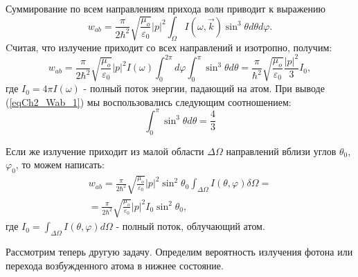 Суммирование по всем направлениям прихода волн приводит к выражению
\begin{equation}
w_{ab} = \frac{\pi}{2 \hbar^2}\sqrt{\frac{\mu_o}{\varepsilon_0}}
\left|p\right|^2
\int_{\Omega}I\left(\omega, \vec{k}\right)
\sin^3 \theta d \theta d \varphi.
\end{equation}
Cчитая, что излучение приходит со всех направлений и изотропно, 
получим: 
\begin{equation}
w_{ab} = \frac{\pi}{2 \hbar^2}\sqrt{\frac{\mu_o}{\varepsilon_0}}
\left|p\right|^2 I\left(\omega\right)
\int_{0}^{2 \pi}d \varphi \int_0^{\pi}
\sin^3 \theta d \theta = 
\frac{\pi}{ \hbar^2}\sqrt{\frac{\mu_o}{\varepsilon_0}}
\frac{\left|p\right|^2}{3}I_0,
\label{eqCh2_Wab_1}
\end{equation}
где $I_0 = 4 \pi I\left(\omega\right)$ - полный поток энергии,
падающий на атом. При выводе  (\ref{eqCh2_Wab_1})
мы воспользовались следующим соотношением:
\[
 \int_0^{\pi}
\sin^3 \theta d \theta = \frac{4}{3}
\]

Если же излучение приходит из малой области
$\Delta \Omega$ направлений вблизи углов $\theta_0$, $\varphi_0$, то 
можем написать:  
\begin{eqnarray}
w_{ab} = \frac{\pi}{2 \hbar^2}\sqrt{\frac{\mu_o}{\varepsilon_0}}
\left|p\right|^2 \sin^2 \theta_0
\int_{\Delta \Omega} I\left(\theta, \varphi\right)
\delta \Omega = 
\nonumber \\
= 
\frac{\pi}{2 \hbar^2}\sqrt{\frac{\mu_o}{\varepsilon_0}}
\left|p\right|^2  I_0 \sin^2 \theta_0,
\label{eqCh2_Wab_2}
\end{eqnarray}
где $I_0 = \int_{\Delta \Omega} I\left(\theta, \varphi\right)
d \Omega$ -  полный поток, облучающий атом.

Рассмотрим теперь другую задачу. Определим вероятность излучения
фотона или перехода возбужденного атома в нижнее состояние.  

